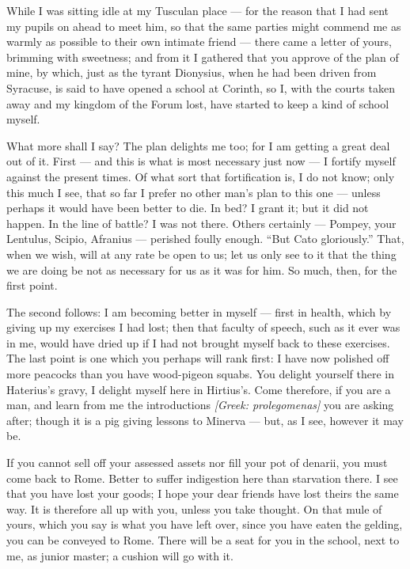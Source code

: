 

 While I was sitting idle at my Tusculan place --- for the reason that I had sent my pupils on ahead to meet him, so that the same parties might commend me as warmly as possible to their own intimate friend --- there came a letter of yours, brimming with sweetness; and from it I gathered that you approve of the plan of mine, by which, just as the tyrant Dionysius, when he had been driven from Syracuse, is said to have opened a school at Corinth, so I, with the courts taken away and my kingdom of the Forum lost, have started to keep a kind of school myself.

 What more shall I say? The plan delights me too; for I am getting a great deal out of it. First --- and this is what is most necessary just now --- I fortify myself against the present times. Of what sort that fortification is, I do not know; only this much I see, that so far I prefer no other man's plan to this one --- unless perhaps it would have been better to die. In bed? I grant it; but it did not happen. In the line of battle? I was not there. Others certainly --- Pompey, your Lentulus, Scipio, Afranius --- perished foully enough. ``But Cato gloriously.'' That, when we wish, will at any rate be open to us; let us only see to it that the thing we are doing be not as necessary for us as it was for him. So much, then, for the first point.

 The second follows: I am becoming better in myself --- first in health, which by giving up my exercises I had lost; then that faculty of speech, such as it ever was in me, would have dried up if I had not brought myself back to these exercises. The last point is one which you perhaps will rank first: I have now polished off more peacocks than you have wood-pigeon squabs. You delight yourself there in Haterius's gravy, I delight myself here in Hirtius's. Come therefore, if you are a man, and learn from me the introductions \textit{[Greek: prolegomenas]} you are asking after; though it is a pig giving lessons to Minerva --- but, as I see, however it may be.

 If you cannot sell off your assessed assets nor fill your pot of denarii, you must come back to Rome. Better to suffer indigestion here than starvation there. I see that you have lost your goods; I hope your dear friends have lost theirs the same way. It is therefore all up with you, unless you take thought. On that mule of yours, which you say is what you have left over, since you have eaten the gelding, you can be conveyed to Rome. There will be a seat for you in the school, next to me, as junior master; a cushion will go with it.
